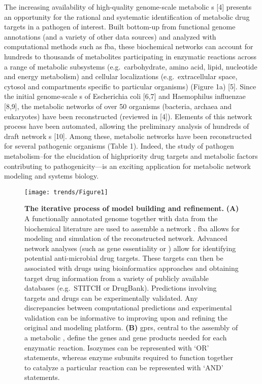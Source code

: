 The increasing availability of high-quality genome-scale 
metabolic s [4] presents an opportunity for the 
rational and systematic identification of metabolic drug 
targets in a pathogen of interest. Built bottom-up from functional 
genome annotations (and a variety of other data sources) and 
analyzed with computational methods such as \gls{fba}, these biochemical networks can account 
for hundreds to thousands of metabolites participating in enzymatic 
reactions across a range of metabolic subsystems (e.g.\ carbohydrate, 
amino acid, lipid, nucleotide and energy metabolism) and cellular 
localizations (e.g.\ extracellular space, cytosol and compartments 
specific to particular organisms) (Figure 1a) [5]. Since the 
initial genome-scale s of Escherichia coli [6,7] 
and Haemophilus influenzae [8,9], the metabolic networks of over 
50 organisms (bacteria, archaea and eukaryotes) have been 
reconstructed (reviewed in [4]). Elements of this network 
 process have been automated, allowing the preliminary 
analysis of hundreds of draft network s [10]. Among 
these, metabolic networks have been reconstructed for several pathogenic 
organisms (Table 1). Indeed, the study of pathogen metabolism–for the 
elucidation of highpriority drug targets and metabolic factors 
contributing to pathogenicity—is an exciting application for 
metabolic network modeling and systems biology.

\begin{figure}[h!]
  \centering
  \texttt{[image: trends/Figure1]}
  \caption[The iterative process of model building and refinement]{
       \textbf{The iterative process of model building and refinement.}
       \textbf{(A)} A 
       functionally annotated genome together with data from the 
       biochemical literature are used to assemble a network 
       . \gls{fba} allows for 
       modeling and simulation of the reconstructed network. 
       Advanced network analyses (such as gene essentiality or 
       ) allow for identifying potential 
       anti-microbial drug targets. These targets can then be 
       associated with drugs using bioinformatics approaches 
       and obtaining target drug information from a variety 
       of publicly available databases (e.g.\ STITCH or DrugBank). 
       Predictions involving targets and drugs can be experimentally 
       validated. Any discrepancies between computational 
       predictions and experimental validation can be informative 
       to improving upon and refining the original  
       and modeling platform. \textbf{(B)} \glspl{gpr}, 
       central to the assembly of a metabolic 
       , define the genes and gene products needed 
       for each enzymatic reaction. Isozymes can be represented 
       with ‘OR’ statements, whereas enzyme subunits required 
       to function together to catalyze a particular reaction 
       can be represented with ‘AND’ statements.
  }
  \label{trends:fig1}
\end{figure}

